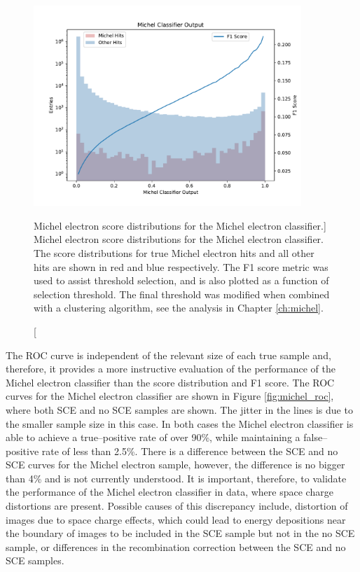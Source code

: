 \begin{figure}
	\centering
	\includegraphics[width=0.9\textwidth]{figures/michel_combined.pdf} 
	\caption
	[Michel electron score distributions for the Michel electron classifier.]
	{Michel electron score distributions for the Michel electron classifier. The
	score distributions for true Michel electron hits and all other hits are shown
	in red and blue respectively. The F1 score metric was used to assist 
	threshold selection, and is also plotted as a function of selection 
	threshold. The final threshold was modified when combined with a clustering 
	algorithm, see the analysis in Chapter \ref{ch:michel}.}
	\label{fig:michel_output}
\end{figure}

The ROC curve is independent of the relevant size of each true sample and,
therefore, it provides a more instructive evaluation of the performance of the
Michel electron classifier than the score distribution and F1 score. The ROC 
curves for the Michel electron classifier are shown in Figure 
\ref{fig:michel_roc}, where both SCE and no SCE samples are shown. The jitter 
in the lines is due to the smaller sample size in this case. In both cases the 
Michel electron classifier is able to achieve a true--positive rate of over 
90\%, while maintaining a false--positive rate of less than 2.5\%. There is a 
difference between the SCE and no SCE curves for the Michel electron sample, 
however, the difference is no bigger than 4\% and is not currently 
understood. It is important, therefore, to validate the performance of the 
Michel electron classifier in data, where space charge distortions are 
present. Possible causes of this discrepancy include, distortion of images due 
to space charge effects, which could lead to energy depositions near the 
boundary of images to be included in the SCE sample but not in the no SCE 
sample, or differences in the recombination correction between the SCE and no 
SCE samples.

